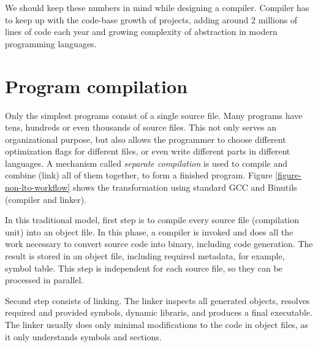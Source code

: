 We should keep these numbers in mind while designing a compiler. Compiler has
to keep up with the code-base growth of projects, adding around 2
millions of lines of code each year and growing complexity of abstraction in
modern programming languages.

\section{Program compilation}

Only the simplest programs consist of a single source file. Many programs have
tens, hundreds or even thousands of source files. This not only serves an
organizational purpose, but also allows the programmer to choose different
optimization flags for different files, or even write different parts in
different languages. A mechanism called {\sl separate compilation} is used to
compile and combine (link) all of them together, to form a finished program.
Figure \ref{figure-non-lto-workflow} shows the transformation using standard GCC
and Binutils (compiler and linker).

In this traditional model, first step is to compile every  source file
(compilation unit) into an object file. In this phase, a compiler is invoked and
does all the work necessary to convert source code into binary, including code
generation. The result is stored in an object file, including required metadata,
for example, symbol table. This step is independent for each source file, so
they can be
processed in parallel. 

Second step consists of linking. The linker inspects all generated objects,
resolves required and provided symbols, dynamic libraris, and produces a
final executable. The linker usually does only minimal modifications to the code
in object files, as it only understands symbols and sections.

